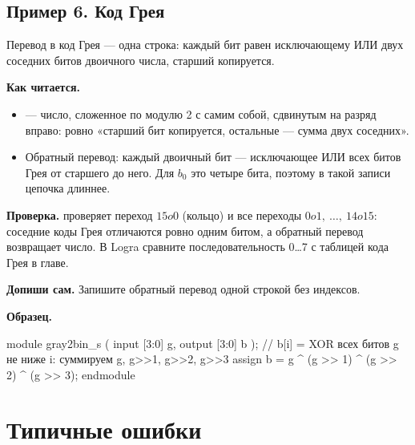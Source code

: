 \subsection{Пример 6. Код Грея}

Перевод в код Грея --- одна строка: каждый бит равен исключающему ИЛИ двух
соседних битов двоичного числа, старший копируется.


\textbf{Как читается.}
\begin{itemize}
  \item {} --- число, сложенное по модулю 2 с самим собой, сдвинутым на разряд вправо: ровно «старший бит копируется, остальные --- сумма двух соседних».
  \item Обратный перевод: каждый двоичный бит --- исключающее ИЛИ всех битов Грея от старшего до него. Для $b_0$ это четыре бита, поэтому в такой записи цепочка длиннее.
\end{itemize}
\textbf{Проверка.}  проверяет переход $15	o 0$ (кольцо) и все переходы
$0	o 1,\ \ldots,\ 14	o 15$: соседние коды Грея отличаются ровно одним битом, а обратный
перевод возвращает число. В Logra сравните последовательность 0\ldots 7 с
таблицей кода Грея в главе.

\textbf{Допиши сам.} Запишите обратный перевод одной строкой без индексов.

\textbf{Образец.}\par\nopagebreak
\begin{vcode}
module gray2bin_s (
    input  [3:0] g,
    output [3:0] b
);
    // b[i] = XOR всех битов g не ниже i: суммируем g, g>>1, g>>2, g>>3
    assign b = g ^ (g >> 1) ^ (g >> 2) ^ (g >> 3);
endmodule
\end{vcode}

\section{Типичные ошибки}

